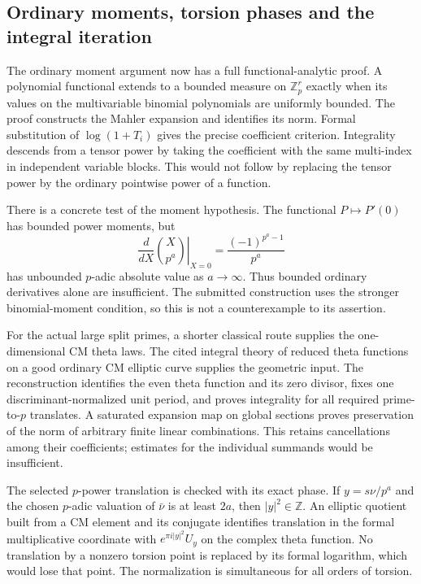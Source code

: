 \documentclass[11pt,a4paper]{article}
\theoremstyle{remark}
\begin{document}
\subsection{Ordinary moments, torsion phases and the integral iteration}

The ordinary moment argument now has a full functional-analytic
proof. A polynomial functional extends to a bounded measure on
$\mathbb Z_p^r$ exactly when its values on the multivariable
binomial polynomials are uniformly bounded. The proof constructs
the Mahler expansion and identifies its norm. Formal substitution
of $\log(1+T_i)$ gives the precise coefficient criterion.
Integrality descends from a tensor power by taking the coefficient
with the same multi-index in independent variable blocks.
This would not follow by replacing the tensor power by the
ordinary pointwise power of a function.

There is a concrete test of the moment hypothesis. The functional
$P\mapsto P'(0)$ has bounded power moments, but
\[
 \left.\frac{d}{dX}\binom{X}{p^a}\right|_{X=0}
                       =\frac{(-1)^{p^a-1}}{p^a}
\]
has unbounded $p$-adic absolute value as $a\to\infty$.
Thus bounded ordinary derivatives alone are insufficient.
The submitted construction uses the stronger binomial-moment
condition, so this is not a counterexample to its assertion.

For the actual large split primes, a shorter classical route
supplies the one-dimensional CM theta laws.
The cited integral theory of reduced theta functions on a good
ordinary CM elliptic curve supplies the geometric input.
\cite{bannai-kobayashi-2007}
The reconstruction identifies the even theta function and its
zero divisor, fixes one discriminant-normalized unit period,
and proves integrality for all required prime-to-$p$ translates.
A saturated expansion map on global sections proves preservation
of the norm of arbitrary finite linear combinations. This retains
cancellations among their coefficients; estimates for the
individual summands would be insufficient.

The selected $p$-power translation is checked with its exact phase.
If $y=s\nu/p^a$ and the chosen $p$-adic valuation of
$\bar\nu$ is at least $2a$, then $|y|^2\in\mathbb Z$.
An elliptic quotient built from a CM element and its conjugate
identifies translation in the formal multiplicative coordinate
with $e^{\pi i|y|^2}U_y$ on the complex theta function.
No translation by a nonzero torsion point is replaced by its
formal logarithm, which would lose that point.
The normalization is simultaneous for all orders of torsion.
\end{document}

